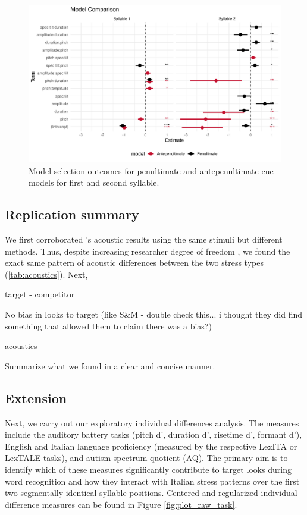 \begin{figure}[H]
  \centering
  \includegraphics[width=1\linewidth]{visuals/analysis_3_plot.jpeg} %
  \caption{Model selection outcomes for penultimate and antepenultimate cue models for first and second syllable.}
  \label{fig:analysis_3_plot }
\end{figure}

\subsection{Replication summary}
We first corroborated \cite{Sulpizio_McQueen_2012}'s acoustic results using the same stimuli but different methods. Thus, despite increasing researcher degree of freedom \citep{Corretta2023}, we found the exact same pattern of acoustic differences between the two stress types (\ref{tab:acoustics}). Next, 

target - competitor

No bias in looks to target (like S\&M - double check this... i thought they did find something that allowed them to claim there was a bias?) 

acoustics 

Summarize what we found in a clear and concise manner.


\subsection{Extension}

Next, we carry out our exploratory individual differences analysis. The measures include the auditory battery tasks (pitch d', duration d', risetime d', formant d'), English and Italian language proficiency (measured by the respective LexITA or LexTALE tasks), and autism spectrum quotient (AQ). The primary aim is to identify which of these measures significantly contribute to target looks during word recognition and how they interact with Italian stress patterns over the first two segmentally identical syllable positions. Centered and regularized individual difference measures can be found in Figure \ref{fig:plot_raw_task}.

